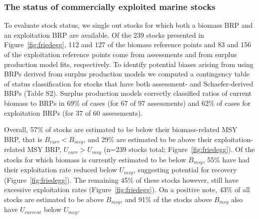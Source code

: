 
\subsubsection*{The status of commercially exploited marine stocks }
To evaluate stock status, we single out stocks for which both a biomass
BRP and an exploitation BRP are available. Of the
239 stocks presented in
Figure~\ref{fig:friedegg}, 112 and
127 of the biomass reference points and
83 and
156 of the exploitation reference
points come from assessments and from surplus production model fits,
respectively.  To identify potential biases arising from using BRPs
derived from surplus production models we computed a contingency table
of status classification for stocks that have both assessment- and
Schaefer-derived BRPs (Table S2). Surplus production models correctly
classified ratios of current biomass to BRPs in
69\% of cases (for 67
of 97 assessments) and 62\%
of cases for exploitation BRPs (for 37 of
60 assessments).



Overall, 57\% of stocks are estimated
to be below their biomass-related MSY BRP, that is $B_{curr}<B_{msy}$,
and 29\% are estimated to be above
their exploitation-related MSY BRP, $U_{curr}>U_{msy}$
(n=239 stocks total; Figure~\ref{fig:friedegg}).
Of the stocks for which biomass is currently estimated to be below
$B_{msy}$, 55\% have had their
exploitation rate reduced below $U_{msy}$, suggesting potential for
recovery (Figure~\ref{fig:friedegg}). The remaining
45\% of these stocks however,
still have excessive exploitation rates (Figure~\ref{fig:friedegg}).
On a positive note, 43\% of all stocks are
estimated to be above $B_{msy}$, and
91\% of the stocks above
$B_{msy}$ also have $U_{current}$ below $U_{msy}$.




